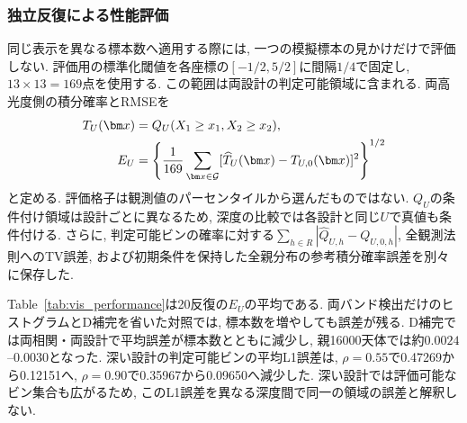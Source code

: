 \subsubsection{独立反復による性能評価}
\label{subsubsec:vis_performance}

同じ表示を異なる標本数へ適用する際には, 一つの模擬標本の見かけだけで評価しない. 評価用の標準化閾値を各座標の$[-1/2,5/2]$に間隔$1/4$で固定し, $13\times13=169$点を使用する. この範囲は両設計の判定可能領域に含まれる. 両高光度側の積分確率とRMSEを
\begin{align}
T_U(\bm x)&=Q_U(X_1\ge x_1,X_2\ge x_2),\notag\\
E_U&=\left\{\frac1{169}\sum_{\bm x\in\mathcal G}
[\widehat T_U(\bm x)-T_{U,0}(\bm x)]^2\right\}^{1/2}
\label{eq:vis_bright_probability_error}
\end{align}
と定める. 評価格子は観測値のパーセンタイルから選んだものではない. $Q_U$の条件付け領域は設計ごとに異なるため, 深度の比較では各設計と同じ$U$で真値も条件付ける. さらに, 判定可能ビンの確率に対する$\sum_{h\in R}|\widehat Q_{U,h}-Q_{U,0,h}|$, 全観測法則へのTV誤差, および初期条件を保持した全親分布の参考積分確率誤差を別々に保存した.

Table~\ref{tab:vis_performance}は20反復の$E_U$の平均である. 両バンド検出だけのヒストグラムとD補完を省いた対照では, 標本数を増やしても誤差が残る. D補完では両相関・両設計で平均誤差が標本数とともに減少し, 親16000天体では約$0.0024$--$0.0030$となった. 深い設計の判定可能ビンの平均L1誤差は, $\rho=0.55$で0.47269から0.12151へ, $\rho=0.90$で0.35967から0.09650へ減少した. 深い設計では評価可能なビン集合も広がるため, このL1誤差を異なる深度間で同一の領域の誤差と解釈しない.


